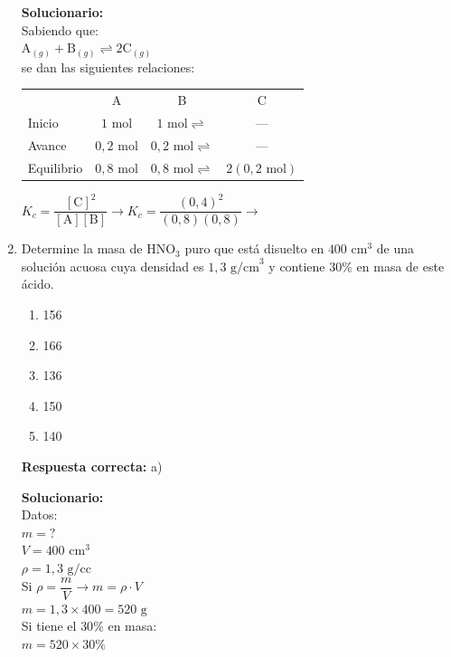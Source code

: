 \begin{enumerate}
	\vspace{2mm}
	\textbf{Solucionario:}\\
	Sabiendo que:\\
	$\text{A}_{(g)} + \text{B}_{(g)} \rightleftharpoons 2\text{C}_{(g)}$\\
	se dan las siguientes relaciones:\\
	\begin{center}
		\begin{tabular}{lccc}
			& A & B & C \\
			Inicio & $1\text{ mol}$ & $1\text{ mol}  \rightleftharpoons $ & --- \\
			Avance & $0,2\text{ mol}$ & $0,2\text{ mol}  \rightleftharpoons$ & --- \\
			Equilibrio & $0,8\text{ mol}$ & $0,8\text{ mol} \rightleftharpoons$ & $2(0,2\text{ mol})$
		\end{tabular}
	\end{center}
	$ K_c = \dfrac{[\text{C}]^2}{[\text{A}][\text{B}]} \rightarrow K_c = \dfrac{(0,4)^2}{(0,8)(0,8)} \rightarrow$ 
	
	\vspace{6mm}
	
	\item Determine la masa de $\text{HNO}_3$ puro que está disuelto en $400\text{ cm}^3$ de una solución acuosa cuya densidad es $1,3\text{ g/cm}^3$ y contiene $30\%$ en masa de este ácido.
	\begin{enumerate}[label=\alph*)]
		\item 156
		\item 166
		\item 136
		\item 150
		\item 140
	\end{enumerate}
	\textbf{Respuesta correcta:} a)
	
	\vspace{2mm}
	\textbf{Solucionario:}\\
	Datos:\\
	$m = ?$\\
	$V = 400\text{ cm}^3$\\
	$\rho = 1,3\text{ g/cc}$\\
	Si $\rho = \dfrac{m}{V} \rightarrow m = \rho \cdot V$\\
	
	$ m = 1,3 \times 400 = 520\text{ g} $\\
	Si tiene el $30\%$ en masa:\\
	$ m = 520 \times 30\% $\\
	

\end{enumerate}
